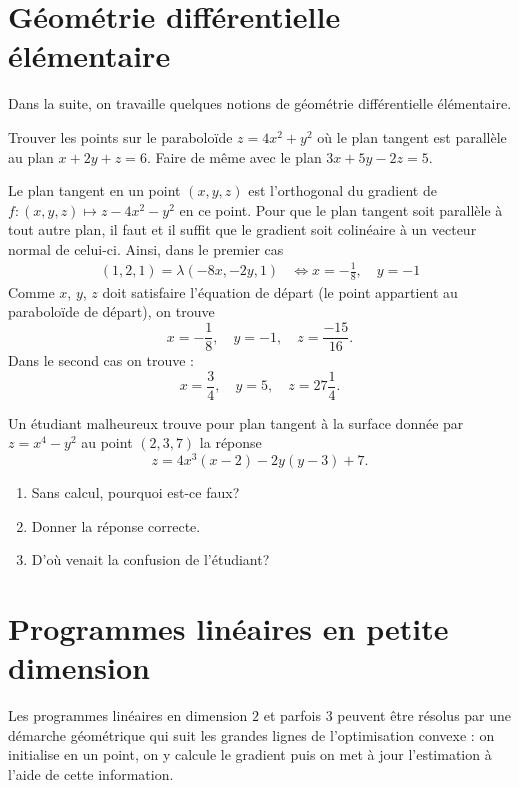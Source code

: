 \documentclass[11pt, a4paper]{article}
\begin{document}
\section{Géométrie différentielle élémentaire}

Dans la suite, on travaille quelques notions de géométrie
différentielle élémentaire.

\begin{question}
  Trouver les points sur le paraboloïde $z = 4x^2 + y^2$ où le plan
  tangent est parallèle au plan $x + 2y + z = 6$. Faire de même avec le plan
  $3x + 5y -2z = 5$.
\end{question}
\begin{solution}
  Le plan tangent en un point $(x, y, z)$ est l'orthogonal du gradient
  de $f : (x, y, z) \mapsto z - 4x^2 - y^2$ en ce point. Pour que le
  plan tangent soit parallèle à tout autre plan, il faut et il suffit
  que le gradient soit colinéaire à un vecteur normal de
  celui-ci. Ainsi, dans le premier cas
  \begin{align}
    (1, 2, 1) = \lambda(-8x, -2y, 1) & \Longleftrightarrow x = -\frac{1}{8}, \quad y = -1
  \end{align}
  Comme $x$, $y$, $z$ doit satisfaire l'équation de départ (le point
  appartient au paraboloïde de départ), on trouve
  \[
  x = -\frac{1}{8}, \quad y = -1, \quad z = \frac{-15}{16}.
  \]
  Dans le second cas on trouve : 
  \[
  x = \frac{3}{4}, \quad y = 5, \quad z = 27\frac{1}{4}.
  \]
\end{solution}


\begin{question}
  Un étudiant malheureux trouve pour plan tangent à la surface donnée
  par $z = x^4-y^2$ au point $(2, 3, 7)$ la réponse
  \[
  z = 4x^3(x-2) - 2y(y-3) + 7.
  \]
  \begin{enumerate}
  \item Sans calcul, pourquoi est-ce faux?
  \item Donner la réponse correcte.
  \item D'où venait la confusion de l'étudiant?
  \end{enumerate}
\end{question}

\section{Programmes linéaires en petite dimension}

Les programmes linéaires en dimension $2$ et parfois $3$ peuvent être
résolus par une démarche géométrique qui suit les grandes lignes de
l'optimisation convexe : on initialise en un point, on y calcule le
gradient puis on met à jour l'estimation à l'aide de cette
information. 
\end{document}
